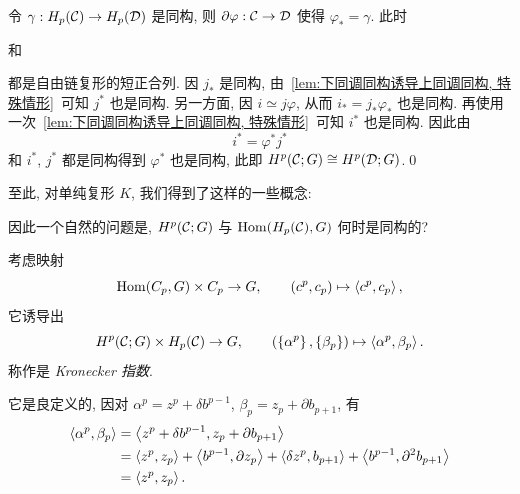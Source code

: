 \begin{Proof}
	令 $ \gamma : H_p(\mathcal{C})\to H_p(\mathcal{D}) $ 是同构, 则 $ \partial\varphi : \mathcal{C}\to\mathcal{D} $ 使得 $ \varphi_*=\gamma $. 此时
	\begin{center}
	\end{center}
	和
	\begin{center}
	\end{center}
	都是自由链复形的短正合列. 因 $ j_* $ 是同构, 由~\ref{lem:下同调同构诱导上同调同构, 特殊情形}~可知 $ j^* $ 也是同构. 另一方面, 因 $ i\simeq j\varphi $, 从而 $ i_*=j_*\varphi_* $ 也是同构. 再使用一次~\ref{lem:下同调同构诱导上同调同构, 特殊情形}~可知 $ i^* $ 也是同构. 因此由
	\[
		i^*=\varphi^*j^*
	\]
	和 $ i^* $, $ j^* $ 都是同构得到 $ \varphi^* $ 也是同构, 此即 $ H^p(\mathcal{C};G)\cong H^p(\mathcal{D};G) $.\qed
\end{Proof}

至此, 对单纯复形 $ K $, 我们得到了这样的一些概念:
\begin{center}
\end{center}
因此一个自然的问题是, $ H^p(\mathcal{C};G) $ 与 $ \mathrm{Hom}(H_p(\mathcal{C}),G) $ 何时是同构的?

考虑映射
\[
	\mathrm{Hom}(C_p,G)\times C_p\to G,\qquad (c^p,c_p)\mapsto\left\langle c^p,c_p \right\rangle,
\]
它诱导出
\[
	H^p(\mathcal{C};G)\times H_p(\mathcal{C})\to G,\qquad (\left\{ \alpha^p \right\},\left\{ \beta_p \right\})\mapsto\left\langle \alpha^p,\beta_p \right\rangle.
\]
称作是 \emph{Kronecker 指数}.

它是良定义的, 因对 $ \alpha^p=z^p+\delta b^{p-1} $, $ \beta_p=z_p+\partial b_{p+1} $, 有
\[
	\begin{aligned}
		\left\langle \alpha^p,\beta_p \right\rangle&=\left\langle z^p+\delta b^{p-1},z_p+\partial b_{p+1} \right\rangle\\
		&=\left\langle z^p,z_p \right\rangle+\left\langle b^{p-1},\partial z_p \right\rangle+\left\langle \delta z^p, b_{p+1} \right\rangle+\left\langle b^{p-1},\partial^2b_{p+1} \right\rangle\\
		&=\left\langle z^p,z_p \right\rangle.
	\end{aligned}
\]

